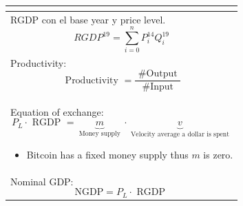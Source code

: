 \documentclass[openany]{book}
\begin{document}
\begin{center}
\begin{supertabular}{ |p{16cm}| }
\[        \] \\
        \hline
        RGDP con el base year y price level. 
        \[
          RGDP^{19} = \sum_{i=0}^{n}P_{i}^{14} Q_{i}^{19}
        \] \\ 
        \hline 
        Productivity:  
        \[
            \text{ Productivity } = \frac{\text{ \#Output }}{\text{ \#Input }} 
        \] \\ 
        \hline
        Equation of exchange: 
        \[
          P_L \cdot \text{ RGDP } = \underbrace{m}_{\text{ Money supply }} \cdot \underbrace{v}_{\text{ Velocity average a dollar is spent }}
        \] \begin{itemize}
            \item Bitcoin has a fixed money supply thus $m$ is zero. 
        \end{itemize}\\ 
        \hline
        Nominal GDP: 
        \[
          \text{NGDP} = P_L \cdot \text{ RGDP }
        \] \\ 
        \hline
    \end{supertabular}
\end{center}


\end{document}
